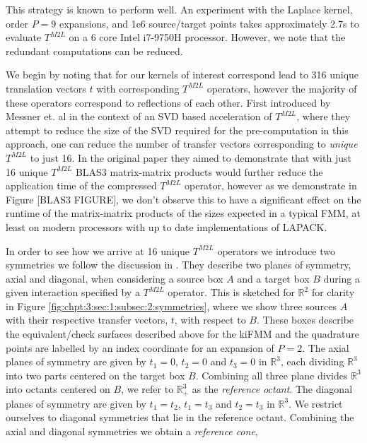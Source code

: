 This strategy is known to perform well. An experiment with the Laplace kernel, order $P=9$ expansions, and 1e6 source/target points takes approximately 2.7s to evaluate $T^{M2L}$ on a 6 core Intel i7-9750H processor. However, we note that the redundant computations can be reduced.

We begin by noting that for our kernels of interest correspond lead to 316 unique translation vectors $t$ with corresponding $T^{M2L}$ operators, however the majority of these operators correspond to reflections of each other. First introduced by Messner et. al \cite{messner2012optimized} in the context of an SVD based acceleration of $T^{M2L}$, where they attempt to reduce the size of the SVD required for the pre-computation in this approach, one can reduce the number of transfer vectors corresponding to \textit{unique} $T^{M2L}$ to just 16. In the original paper they aimed to demonstrate that with just 16 unique $T^{M2L}$ BLAS3 matrix-matrix products would further reduce the application time of the compressed $T^{M2L}$ operator, however as we demonstrate in Figure [BLAS3 FIGURE], we don't observe this to have a significant effect on the runtime of the matrix-matrix products of the sizes expected in a typical FMM, at least on modern processors with up to date implementations of LAPACK.

In order to see how we arrive at 16 unique $T^{M2L}$ operators we introduce two symmetries we follow the discussion in \cite{messner2012optimized}. They describe two planes of symmetry, axial and diagonal, when considering a source box $A$ and a target box $B$ during a given interaction specified by a $T^{M2L}$ operator. This is sketched for $\mathbb{R}^2$ for clarity in Figure \ref{fig:chpt:3:sec:1:subsec:2:symmetries}, where we show three sources $A$ with their respective transfer vectors, $t$, with respect to $B$. These boxes describe the equivalent/check surfaces described above for the kiFMM and the quadrature points are labelled by an index coordinate for an expansion of $P=2$. The axial planes of symmetry are given by $t_1 = 0$, $t_2 = 0$ and $t_3 = 0$ in $\mathbb{R}^3$, each dividing $\mathbb{R}^3$ into two parts centered on the target box $B$. Combining all three plane divides $\mathbb{R}^3$ into octants centered on $B$, we refer to $\mathbb{R}^3_+$ as the \textit{reference octant}. The diagonal planes of symmetry are given by $t_1 = t_2$, $t_1 = t_3$ and $t_2 = t_3$ in $\mathbb{R}^3$. We restrict ourselves to diagonal symmetries that lie in the reference octant. Combining the axial and diagonal symmetries we obtain a \textit{reference cone},

